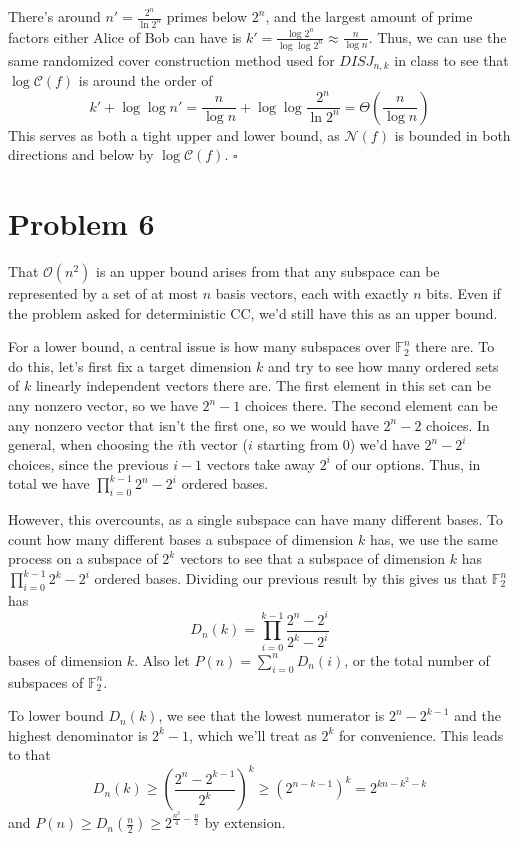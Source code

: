 \documentclass[12pt]{article}
\begin{document}
There's around $n'=\frac{2^n}{\ln 2^n}$ primes below $2^n$, and the largest
amount of prime factors either Alice of Bob can have is
$k'=\frac{\log 2^n}{\log \log 2^n} \approx \frac{n}{\log n}$.
Thus, we can use the same randomized cover construction method used for $DISJ_{n,k}$
in class to see that $\log \mathcal{C}(f)$ is around the order of
\[k'+\log \log n'=\frac{n}{\log n}+\log \log \frac{2^n}{\ln 2^n} = \Theta\left(\frac{n}{\log n}\right)\]
This serves as both a tight upper and lower bound, as $\mathcal{N}(f)$ is bounded
in both directions and below by $\log \mathcal{C}(f)$. $\square$

\newpage

\section*{Problem 6}

That $\mathcal{O}(n^2)$ is an upper bound arises from that any subspace can be represented
by a set of at most $n$ basis vectors, each with exactly $n$ bits.
Even if the problem asked for deterministic CC, we'd still have this as an upper bound.

For a lower bound, a central issue is how many subspaces over $\mathbb{F}_2^n$ there are.
To do this, let's first fix a target dimension $k$ and try to see
how many ordered sets of $k$ linearly independent vectors there are.
The first element in this set can be any nonzero vector, so we have $2^n - 1$ choices there.
The second element can be any nonzero vector that isn't the first one,
so we would have $2^n-2$ choices.
In general, when choosing the $i$th vector ($i$ starting from $0$) we'd have $2^n-2^i$ choices,
since the previous $i-1$ vectors take away $2^i$ of our options.
Thus, in total we have $\prod_{i=0}^{k-1} 2^n-2^i$ ordered bases.

However, this overcounts, as a single subspace can have many different bases.
To count how many different bases a subspace of dimension $k$ has,
we use the same process on a subspace of $2^k$ vectors to see that
a subspace of dimension $k$ has $\prod_{i=0}^{k-1} 2^k-2^i$ ordered bases.
Dividing our previous result by this gives us that $\mathbb{F}_2^n$ has
\[D_n(k)=\prod_{i=0}^{k-1} \frac{2^n-2^i}{2^k-2^i}\]
bases of dimension $k$.
Also let $P(n)=\sum_{i=0}^{n} D_n(i)$, or the total number of subspaces of $\mathbb{F}_2^n$.

To lower bound $D_n(k)$, we see that the lowest numerator is $2^n-2^{k-1}$ and
the highest denominator is $2^k-1$, which we'll treat as $2^k$ for convenience.
This leads to that
\[D_n(k) \ge \left(\frac{2^n-2^{k-1}}{2^k}\right)^k \ge \left(2^{n-k-1}\right)^k=2^{kn-k^2-k}\]
and $P(n) \ge D_n\left(\frac{n}{2}\right) \ge 2^{\frac{n^2}{4}-\frac{n}{2}}$ by extension.
\end{document}
